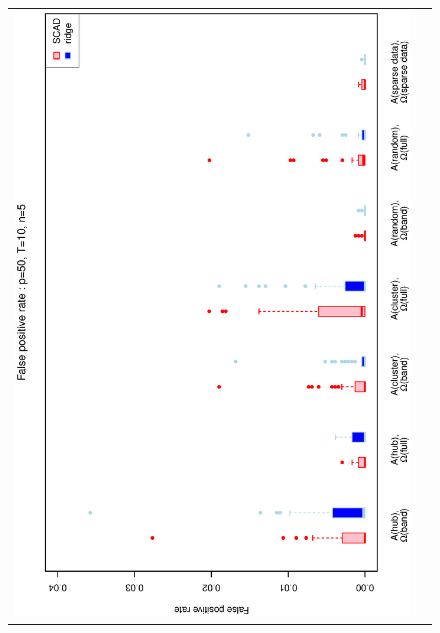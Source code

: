 \documentclass[a4paper]{article}
\begin{document}
\begin{figure}[h!]
\centering
\begin{tabular}{cc}
\includegraphics[scale=0.5,angle=270]{ROCfpr50T10N5a.eps}\\

\end{tabular}
\end{figure}
\end{document}
